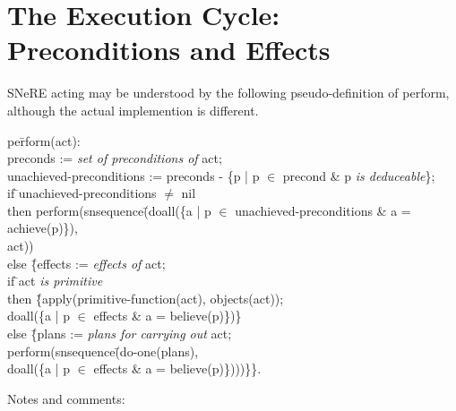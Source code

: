 \documentclass{book}
\makeatletter
\newcommand{\ct}[1]{{\ttfamily #1}} %
\newcommand{\indexct}[1]{\index{#1@\ct{#1}}} %
\makeatother
\begin{document}
\section{The Execution Cycle: Preconditions and Effects}\label{executive:sec}
SNeRE acting may be understood by the following pseudo-definition of
\ct{perform}, although the actual implemention is different.
\indexct{perform}
\begin{tabbing}
\ttfamily per\=\ttfamily form(act):\\
\>\ttfamily preconds := {\itshape set of preconditions of} act;\\
\>\ttfamily unachieved-preconditions := preconds - \{p | p $\in$ precond \&
p {\itshape is deduceable}\};\\
\>\ttfamily if \=\ttfamily unachieved-preconditions $\neq$ nil\\
\>\>\ttfamily then perform(snsequence(\=\ttfamily doall(\{a | p $\in$
unachieved-preconditions \& a = achieve(p)\}),\\
\>\>\>\ttfamily act))\\
\>\>\ttfamily else \{\=\ttfamily effects := {\itshape effects of} act;\\
\>\>\>\ttfamily if \=\ttfamily act {\itshape is primitive}\\
\>\>\>\>\ttfamily then \{\=\ttfamily apply(primitive-function(act), objects(act));\\
\>\>\>\>\>\ttfamily doall(\{a | p $\in$ effects \& a = believe(p)\})\}\\
\>\>\>\>\ttfamily else \{\=\ttfamily plans := {\itshape plans for carrying out} act;\\
\>\>\>\>\>\ttfamily perform(snsequence(\=\ttfamily do-one(plans),\\
\>\>\>\>\>\>\ttfamily doall(\{a | p $\in$ effects \& a = believe(p)\})))\}\}.
\end{tabbing}
Notes and comments:
\end{document}
